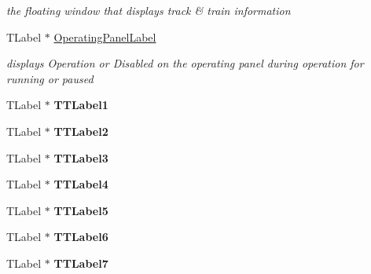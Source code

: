 \begin{DoxyCompactItemize}
\begin{DoxyCompactList}\small\item\em the floating window that displays track \& train information \end{DoxyCompactList}\item 
\mbox{\label{class_t_interface_a167b9a4eba88ea3020f67a1c89907838}} 
T\+Label $\ast$ \mbox{\hyperlink{class_t_interface_a167b9a4eba88ea3020f67a1c89907838}{Operating\+Panel\+Label}}
\begin{DoxyCompactList}\small\item\em displays \textquotesingle{}Operation\textquotesingle{} or \textquotesingle{}Disabled\textquotesingle{} on the operating panel during operation for running or paused \end{DoxyCompactList}\item 
\mbox{\label{class_t_interface_aaf476d1498548ff2b79c6cb0e85b6f2e}} 
T\+Label $\ast$ {\bfseries T\+T\+Label1}
\item 
\mbox{\label{class_t_interface_a49b00f8f498e555c564128569ba79fb1}} 
T\+Label $\ast$ {\bfseries T\+T\+Label2}
\item 
\mbox{\label{class_t_interface_a325ea4861a87491ea0a02bb1b9828900}} 
T\+Label $\ast$ {\bfseries T\+T\+Label3}
\item 
\mbox{\label{class_t_interface_a6b94e181d30b95fef0a03d665ec6bff7}} 
T\+Label $\ast$ {\bfseries T\+T\+Label4}
\item 
\mbox{\label{class_t_interface_ac2439e8728fead6b27f38cb466d74acc}} 
T\+Label $\ast$ {\bfseries T\+T\+Label5}
\item 
\mbox{\label{class_t_interface_a06bd6a306411491de4c6ecb7aef89438}} 
T\+Label $\ast$ {\bfseries T\+T\+Label6}
\item 
\mbox{\label{class_t_interface_afb0cd34d62e0d33db11fa1b3b48286a8}} 
T\+Label $\ast$ {\bfseries T\+T\+Label7}
\item 
\mbox{\label{class_t_interface_aaf5b604fe64f91129e881bdc9e041884}} 

\end{DoxyCompactItemize}
